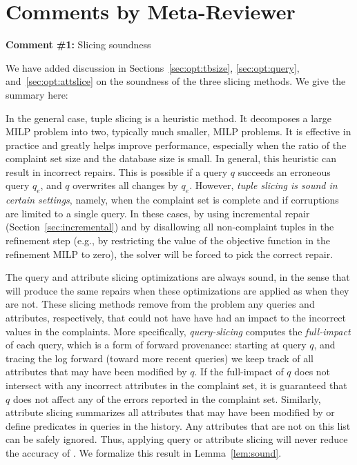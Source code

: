 

\section*{Comments by Meta-Reviewer}

\noindent
\textbf{Comment \#1:} Slicing soundness
\begin{quote}
\end{quote}

We have added discussion in Sections~\ref{sec:opt:tbsize},
\ref{sec:opt:query}, and~\ref{sec:opt:attslice} on the soundness of the three
slicing methods.  We give the summary here:

In the general case, tuple slicing is a heuristic method. It decomposes a
large MILP problem into two, typically much smaller, MILP problems. It is
effective in practice and greatly helps improve \sys performance, especially
when the ratio of the complaint set size and the database size is small. In
general, this heuristic can result in incorrect repairs. This is possible if a
query $q$ succeeds an erroneous query $q_e$, and $q$ overwrites all changes by
$q_e$. However, \emph{tuple slicing is sound in certain settings}, namely,
when the complaint set is complete and if corruptions are limited to a single
query. In these cases, by using incremental repair
(Section~\ref{sec:incremental}) and by disallowing all non-complaint tuples in
the refinement step (e.g., by restricting the value of the objective function
in the refinement MILP to zero), the solver will be forced to pick the correct
repair.



The query and attribute slicing optimizations are always sound, in the sense
that \sys will produce the same repairs when these optimizations are applied
as when they are not. These slicing methods remove from the problem any
queries and attributes, respectively, that could not have have had an impact
to the incorrect values in the complaints. More specifically,
\emph{query-slicing} computes the \emph{full-impact} of each query, which is a
form of forward provenance: starting at query $q$, and tracing the log forward
(toward more recent queries) we keep track of all attributes that may have
been modified by $q$. If the full-impact of $q$ does not intersect with any
incorrect attributes in the complaint set, it is guaranteed that $q$ does not
affect any of the errors reported in the complaint set. Similarly, attribute
slicing summarizes all attributes that may have been modified by or define
predicates in queries in the history. Any attributes that are not on this list
can be safely ignored. Thus, applying query or attribute slicing will never
reduce the accuracy of \sys. We formalize this result in
Lemma~\ref{lem:sound}.


